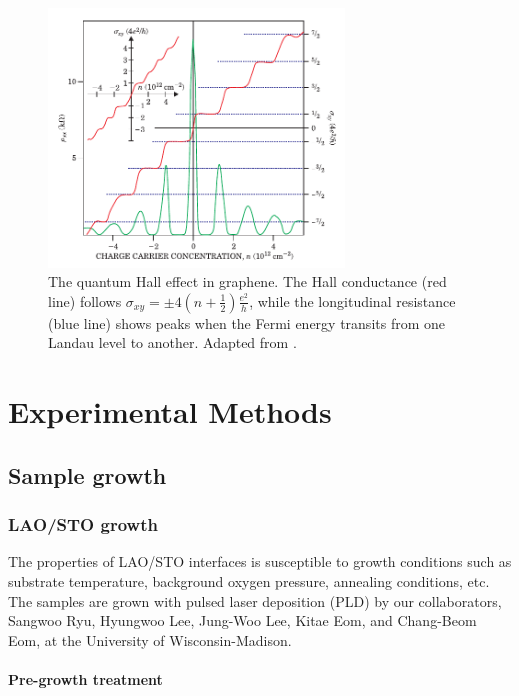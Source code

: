 \documentclass[pdflatex, sectionletters, 12pt, final, phd]{pittetd}    %
\begin{document}
\begin{figure}[p]
	\centering
	\includegraphics[width=0.7\textwidth]{Drawing/GrapheneQuantumHall.pdf}
	\caption[The quantum Hall effect in graphene]{The quantum Hall effect in graphene. The Hall conductance (red line) follows $\displaystyle \sigma_{xy} = \pm4\left(n + \frac{1}{2}\right)\frac{e^2}{h}$, while the longitudinal resistance (blue line) shows peaks when the Fermi energy transits from one Landau level to another. Adapted from \cite{novoselov2005two}.}
	\label{FIG:GrapheneQuantumHall}
\end{figure}


\chapter{Experimental Methods}
\label{SEC:methods}

\section{Sample growth}

\subsection{LAO/STO growth}
The properties of LAO/STO interfaces is susceptible to growth conditions such as substrate temperature, background oxygen pressure, annealing conditions, etc\cite{cancellieri2010influence}. The samples are grown with pulsed laser deposition (PLD)\cite{bark2011tailoring} by our collaborators, Sangwoo Ryu, Hyungwoo Lee, Jung-Woo Lee, Kitae Eom, and Chang-Beom Eom, at the University of Wisconsin-Madison.

\subsubsection{Pre-growth treatment}
\end{document}
